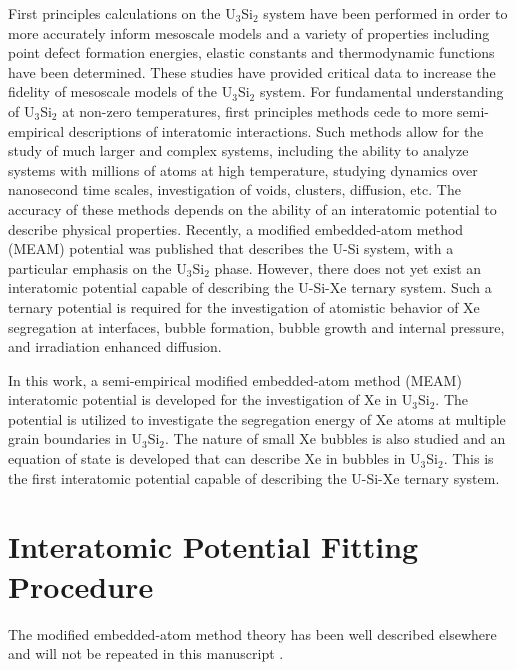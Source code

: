 \documentclass[review]{elsarticle}
\begin{document}
First principles calculations on the U$_3$Si$_2$ system have been performed in order to more accurately inform mesoscale models \cite{noordhoek2016, middleburgh2016, andersson2018, chattaraj2018, wang2016} and a variety of properties including point defect formation energies, elastic constants and thermodynamic functions have been determined. These studies have provided critical data to increase the fidelity of mesoscale models of the U$_3$Si$_2$ system. For fundamental understanding of U$_3$Si$_2$ at non-zero temperatures, first principles methods cede to more semi-empirical descriptions of interatomic interactions. Such methods allow for the study of much larger and complex systems, including the ability to analyze systems with millions of atoms at high temperature, studying dynamics over nanosecond time scales, investigation of voids, clusters, diffusion, etc. The accuracy of these methods depends on the ability of an interatomic potential to describe physical properties. Recently, a modified embedded-atom method (MEAM) potential was published \cite{beelerusi} that describes the U-Si system, with a particular emphasis on the U$_3$Si$_2$ phase. However, there does not yet exist an interatomic potential capable of describing the U-Si-Xe ternary system. Such a ternary potential is required for the investigation of atomistic behavior of Xe segregation at interfaces, bubble formation, bubble growth and internal pressure, and irradiation enhanced diffusion. 

In this work, a semi-empirical modified embedded-atom method (MEAM) interatomic potential is developed for the investigation of Xe in U$_3$Si$_2$. The potential is utilized to investigate the segregation energy of Xe atoms at multiple grain boundaries in U$_3$Si$_2$. The nature of small Xe bubbles is also studied and an equation of state is developed that can describe Xe in bubbles in U$_3$Si$_2$. This is the first interatomic potential capable of describing the U-Si-Xe ternary system.

\section{Interatomic Potential Fitting Procedure}
The modified embedded-atom method theory has been well described elsewhere and will not be repeated in this manuscript \cite{baskes1997, baskes2000, baskes2014, baskes1989, valone2006, liu1999, lee2000, lee2001, lee2003}. 
\end{document}
